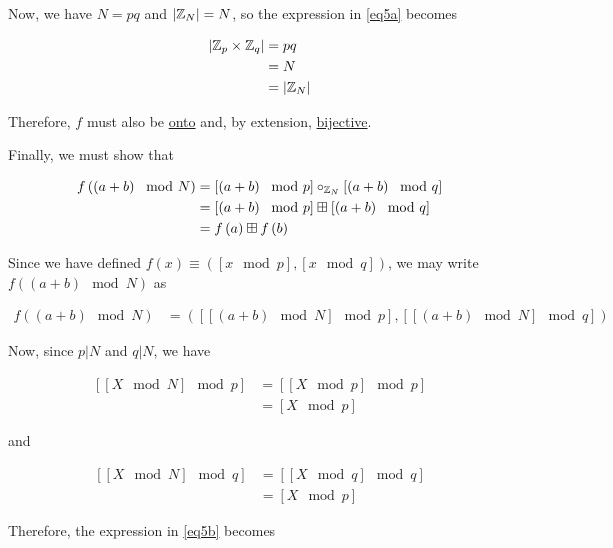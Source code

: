 \documentclass[../CryptoHW3.tex]{subfiles}
\begin{document}
\begin{flushleft}
Now, we have $N = p q$ and $\left| \mathbb{Z}_N \right| = N$, so the expression in \ref{eq5a} becomes

\begin{align*}
  \left| \mathbb{Z}_p \times \mathbb{Z}_q \right| &= p q \\
  &= N \\
  &= \left| \mathbb{Z}_N \right|
\end{align*}

Therefore, $f$ must also be \underline{onto} and, by extension, \underline{bijective}. \newline

Finally, we must show that 

\begin{align*}
  f \left( \left(a + b\right) \mod N \right) &= \left[\left( a + b \right) \mod p \right] \circ_{\mathbb{Z}_N} \left[\left( a + b \right) \mod q \right] \\
  &= \left[\left( a + b \right) \mod p \right] \boxplus \left[\left( a + b \right) \mod q \right] \\
  &= f \left( a \right) \boxplus f \left( b \right)
\end{align*}

Since we have defined $f \left( x \right) \equiv \left( \left[ x \mod p \right], \left[ x \mod q \right] \right)$, we may write $f \left( \left(a + b\right) \mod N \right)$ as 

\begin{align}
  f \left( \left(a + b\right) \mod N \right) &= \left( \left[ \left[ \left(a + b\right) \mod N \right] \mod p \right], \left[ \left[ \left(a + b\right) \mod  N \right] \mod q \right] \right) \label{eq5b}
\end{align}

Now, since $p \vert N$ and $q \vert N$, we have

\begin{align*}
  \left[ \left[ X \mod N \right] \mod p \right] &= \left[ \left[ X \mod p \right] \mod p \right] \\
  &= \left[ X \mod p \right] 
\end{align*}

and

\begin{align*}
  \left[ \left[ X \mod N \right] \mod q \right] &= \left[ \left[ X \mod q \right] \mod q \right] \\
  &= \left[ X \mod p \right] 
\end{align*}

Therefore, the expression in \ref{eq5b} becomes


\end{flushleft}
\end{document}
